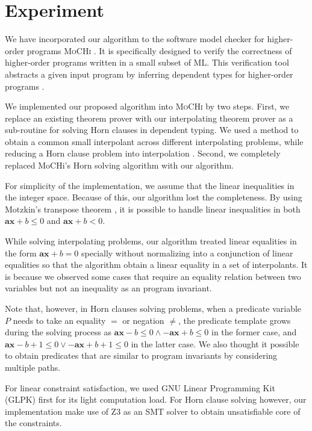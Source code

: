\chapter{Experiment}
\label{chap:experiment}

We have incorporated our algorithm to the software model checker for
higher-order programs \textsc{MoCHi} \cite{conf/pldi/KobayashiSU11}.  It is
specifically designed to verify the correctness of higher-order
programs written in a small subset of ML.  This verification tool
abstracts a given input program by inferring dependent types for
higher-order programs \cite{conf/ppdp/UnnoK09}.

We implemented our proposed algorithm into \textsc{MoCHi} by two steps.  First,
we replace an existing theorem prover with our interpolating theorem
prover as a sub-routine for solving Horn clauses in dependent typing.
We used a method to obtain a common small interpolant across different
interpolating problems, while reducing a Horn clause problem into
interpolation \cite{conf/ppdp/UnnoK09}.  Second, we completely
replaced MoCHi's Horn solving algorithm with our algorithm.

For simplicity of the implementation, we assume that the linear
inequalities in the integer space.  Because of this, our algorithm
lost the completeness.  By using Motzkin's transpose theorem
\cite{journals/networks/Rajan90}, it is possible to handle linear
inequalities in both $\mathbf{ax} + b \leq 0$ and $\mathbf{ax} + b <
0$.

While solving interpolating problems, our algorithm treated linear
equalities in the form $\mathbf{ax} + b = 0$ specially without
normalizing into a conjunction of linear equalities so that the
algorithm obtain a linear equality in a set of interpolants.  It is
because we observed some cases that require an equality relation
between two variables but not an inequality as an program invariant.

Note that, however, in Horn clauses solving problems, when a predicate
variable $P$ needs to take an equality $=$ or negation $\neq$, the
predicate template grows during the solving process as
$\mathbf{ax}-b \leq 0 \wedge -\mathbf{ax}+b \leq 0$ in the former
case, and $\mathbf{ax}-b+1 \leq 0 \vee -\mathbf{ax}+b+1 \leq 0$ in the
latter case.  We also thought it possible to obtain predicates that
are similar to program invariants by considering multiple paths.

For linear constraint satisfaction, we used GNU Linear Programming Kit
(GLPK) first for its light computation load.  For Horn clause solving
however, our implementation make use of Z3 \cite{conf/tacas/MouraB08}
as an SMT solver to obtain unsatisfiable core of the constraints.

